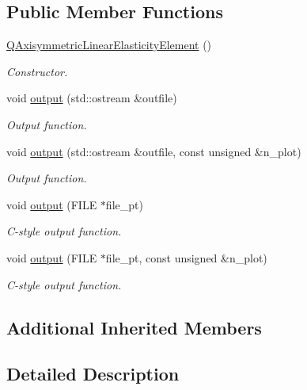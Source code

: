 \subsection*{Public Member Functions}
\begin{DoxyCompactItemize}
\item 
\hyperlink{classoomph_1_1QAxisymmetricLinearElasticityElement_a8d8d6c9c7a7ea32e95643a3314b08402}{Q\+Axisymmetric\+Linear\+Elasticity\+Element} ()
\begin{DoxyCompactList}\small\item\em Constructor. \end{DoxyCompactList}\item 
void \hyperlink{classoomph_1_1QAxisymmetricLinearElasticityElement_adfd535d5ee563df242c0ff5febca99e2}{output} (std\+::ostream \&outfile)
\begin{DoxyCompactList}\small\item\em Output function. \end{DoxyCompactList}\item 
void \hyperlink{classoomph_1_1QAxisymmetricLinearElasticityElement_a3339817db6273a1285615d05d0e99a07}{output} (std\+::ostream \&outfile, const unsigned \&n\+\_\+plot)
\begin{DoxyCompactList}\small\item\em Output function. \end{DoxyCompactList}\item 
void \hyperlink{classoomph_1_1QAxisymmetricLinearElasticityElement_abc4653b755224731a24d641619b2c14e}{output} (F\+I\+LE $\ast$file\+\_\+pt)
\begin{DoxyCompactList}\small\item\em C-\/style output function. \end{DoxyCompactList}\item 
void \hyperlink{classoomph_1_1QAxisymmetricLinearElasticityElement_a50c3225e93aad5867288cf55aac73195}{output} (F\+I\+LE $\ast$file\+\_\+pt, const unsigned \&n\+\_\+plot)
\begin{DoxyCompactList}\small\item\em C-\/style output function. \end{DoxyCompactList}\end{DoxyCompactItemize}
\subsection*{Additional Inherited Members}


\subsection{Detailed Description}
